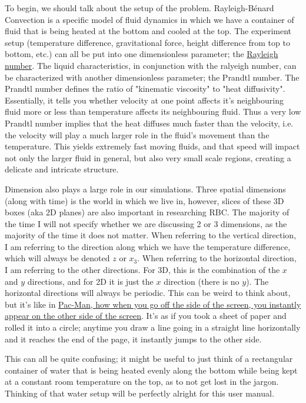 \documentclass[12pt,a4paper]{report}
\begin{document}
	To begin, we should talk about the setup of the problem. Rayleigh-Bénard Convection is a specific model of fluid dynamics in which we have a container of fluid that is being heated at the bottom and cooled at the top. The experiment setup (temperature difference, gravitational force, height difference from top to bottom, etc.) can all be put into one dimensionless parameter; the \href{https://en.wikipedia.org/wiki/Rayleigh_number}{Rayleigh number}. The liquid characteristics, in conjunction with the ralyeigh number, can be characterized with another dimensionless parameter; the Prandtl number. The Prandtl number defines the ratio of "kinematic viscosity" to "heat diffusivity". Essentially, it tells you whether velocity at one point affects it's neighbouring fluid more or less than temperature affects its neighbouring fluid. Thus a very low Prandtl number implies that the heat diffuses much faster than the velocity, i.e. the velocity will play a much larger role in the fluid's movement than the temperature. This yields extremely fast moving fluids, and that speed will impact not only the larger fluid in general, but also very small scale regions, creating a delicate and intricate structure. 

	Dimension also plays a large role in our simulations. Three spatial dimensions (along with time) is the world in which we live in, however, slices of these 3D boxes (aka 2D planes) are also important in researching RBC. The majority of the time I will not specify whether we are discussing 2 or 3 dimensions, as the majority of the time it does not matter. When referring to the vertical direction, I am referring to the direction along which we have the temperature difference, which will always be denoted $z$ or $x_3$. When referring to the horizontal direction, I am referring to the other directions. For 3D, this is the combination of the $x$ and $y$ directions, and for 2D it is just the $x$ direction (there is no $y$). The horizontal directions will always be periodic. This can be weird to think about, but it's like in \href{https://youtu.be/i_OjztdQ8iw?t=29}{Pac-Man, how when you go off the side of the screen, you instantly appear on the other side of the screen}. It's as if you took a sheet of paper and rolled it into a circle; anytime you draw a line going in a straight line horizontally and it reaches the end of the page, it instantly jumps to the other side.
	
	This can all be quite confusing; it might be useful to just think of a rectangular container of water that is being heated evenly along the bottom while being kept at a constant room temperature on the top, as to not get lost in the jargon. Thinking of that water setup will be perfectly alright for this user manual. 
	
\end{document}
